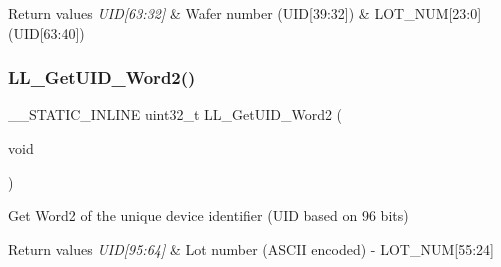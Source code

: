 \begin{DoxyRetVals}{Return values}
{\em U\+I\+D\mbox{[}63\+:32\mbox{]}} & Wafer number (U\+ID\mbox{[}39\+:32\mbox{]}) \& L\+O\+T\+\_\+\+N\+UM\mbox{[}23\+:0\mbox{]} (U\+ID\mbox{[}63\+:40\mbox{]}) \\
\hline
\end{DoxyRetVals}
\mbox{\label{group___u_t_i_l_s___e_f___d_e_v_i_c_e___e_l_e_c_t_r_o_n_i_c___s_i_g_n_a_t_u_r_e_gaa15df2bc902d392f67ee9873943d4904}} 
\subsubsection{\texorpdfstring{L\+L\+\_\+\+Get\+U\+I\+D\+\_\+\+Word2()}{LL\_GetUID\_Word2()}}
{\footnotesize\ttfamily \+\_\+\+\_\+\+S\+T\+A\+T\+I\+C\+\_\+\+I\+N\+L\+I\+NE uint32\+\_\+t L\+L\+\_\+\+Get\+U\+I\+D\+\_\+\+Word2 (\begin{DoxyParamCaption}\item[{void}]{ }\end{DoxyParamCaption})}



Get Word2 of the unique device identifier (U\+ID based on 96 bits) 


\begin{DoxyRetVals}{Return values}
{\em U\+I\+D\mbox{[}95\+:64\mbox{]}} & Lot number (A\+S\+C\+II encoded) -\/ L\+O\+T\+\_\+\+N\+UM\mbox{[}55\+:24\mbox{]} \\
\hline
\end{DoxyRetVals}
